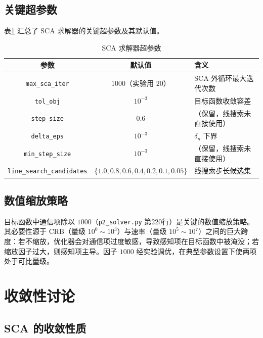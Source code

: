 \subsection{关键超参数}

表\ref{tab:sca_params} 汇总了 SCA 求解器的关键超参数及其默认值。

\begin{table}[htbp]
\centering
\caption{SCA 求解器超参数}
\label{tab:sca_params}
\begin{tabular}{ccl}
\hline
\textbf{参数} & \textbf{默认值} & \textbf{含义} \\
\hline
\texttt{max\_sca\_iter} & $1000$（实验用 $20$） & SCA 外循环最大迭代次数 \\
\texttt{tol\_obj} & $10^{-3}$ & 目标函数收敛容差 \\
\texttt{step\_size} & $0.6$ & （保留，线搜索未直接使用） \\
\texttt{delta\_eps} & $10^{-3}$ & $\delta_n$ 下界 \\
\texttt{min\_step\_size} & $10^{-3}$ & （保留，线搜索未直接使用） \\
\texttt{line\_search\_candidates} & $\{1.0,0.8,0.6,0.4,0.2,0.1,0.05\}$ & 线搜索步长候选集 \\
\hline
\end{tabular}
\end{table}

\subsection{数值缩放策略}

目标函数中通信项除以 $1000$（\texttt{p2\_solver.py} 第220行）是关键的数值缩放策略。其必要性源于 CRB（量级 $10^0\sim 10^3$）与速率（量级 $10^5\sim 10^7$）之间的巨大跨度：若不缩放，优化器会对通信项过度敏感，导致感知项在目标函数中被淹没；若缩放因子过大，则感知项主导。因子 $1000$ 经实验调优，在典型参数设置下使两项处于可比量级。

\section{收敛性讨论}
\label{sec:convergence}

\subsection{SCA 的收敛性质}

